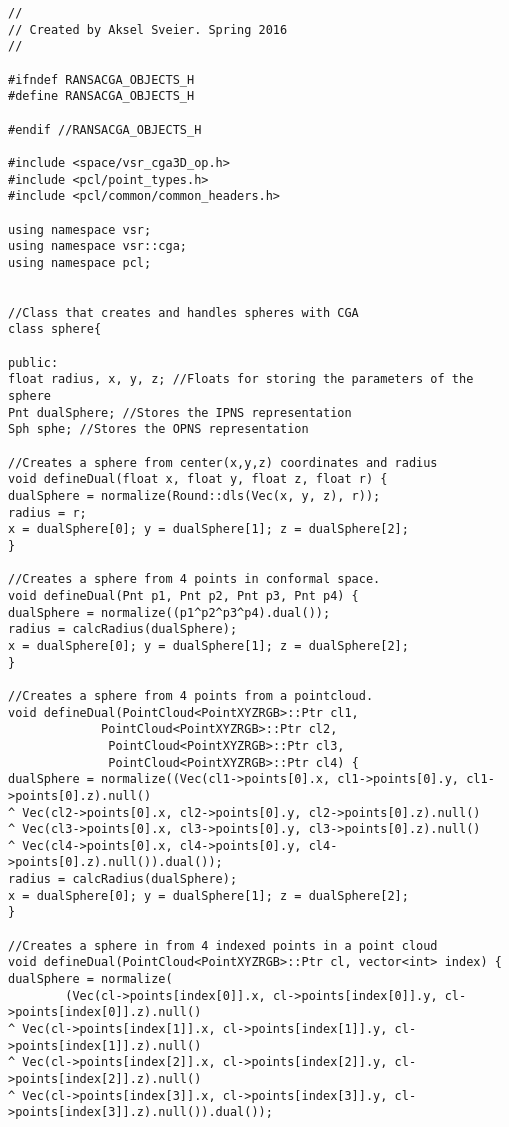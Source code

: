 {\fontsize{7.5}{10} \selectfont
\label{code:objects}
\begin{lstlisting}[caption={Archivo objects.h}]
//
// Created by Aksel Sveier. Spring 2016
//

#ifndef RANSACGA_OBJECTS_H
#define RANSACGA_OBJECTS_H

#endif //RANSACGA_OBJECTS_H

#include <space/vsr_cga3D_op.h>
#include <pcl/point_types.h>
#include <pcl/common/common_headers.h>

using namespace vsr;
using namespace vsr::cga;
using namespace pcl;


//Class that creates and handles spheres with CGA
class sphere{

public:
float radius, x, y, z; //Floats for storing the parameters of the sphere
Pnt dualSphere; //Stores the IPNS representation
Sph sphe; //Stores the OPNS representation

//Creates a sphere from center(x,y,z) coordinates and radius
void defineDual(float x, float y, float z, float r) {
dualSphere = normalize(Round::dls(Vec(x, y, z), r));
radius = r;
x = dualSphere[0]; y = dualSphere[1]; z = dualSphere[2];
}

//Creates a sphere from 4 points in conformal space.
void defineDual(Pnt p1, Pnt p2, Pnt p3, Pnt p4) {
dualSphere = normalize((p1^p2^p3^p4).dual());
radius = calcRadius(dualSphere);
x = dualSphere[0]; y = dualSphere[1]; z = dualSphere[2];
}

//Creates a sphere from 4 points from a pointcloud.
void defineDual(PointCloud<PointXYZRGB>::Ptr cl1,
			 PointCloud<PointXYZRGB>::Ptr cl2,
			  PointCloud<PointXYZRGB>::Ptr cl3,
			  PointCloud<PointXYZRGB>::Ptr cl4) {
dualSphere = normalize((Vec(cl1->points[0].x, cl1->points[0].y, cl1->points[0].z).null()
^ Vec(cl2->points[0].x, cl2->points[0].y, cl2->points[0].z).null()
^ Vec(cl3->points[0].x, cl3->points[0].y, cl3->points[0].z).null()
^ Vec(cl4->points[0].x, cl4->points[0].y, cl4->points[0].z).null()).dual());
radius = calcRadius(dualSphere);
x = dualSphere[0]; y = dualSphere[1]; z = dualSphere[2];
}

//Creates a sphere in from 4 indexed points in a point cloud
void defineDual(PointCloud<PointXYZRGB>::Ptr cl, vector<int> index) {
dualSphere = normalize(
		(Vec(cl->points[index[0]].x, cl->points[index[0]].y, cl->points[index[0]].z).null()
^ Vec(cl->points[index[1]].x, cl->points[index[1]].y, cl->points[index[1]].z).null()
^ Vec(cl->points[index[2]].x, cl->points[index[2]].y, cl->points[index[2]].z).null()
^ Vec(cl->points[index[3]].x, cl->points[index[3]].y, cl->points[index[3]].z).null()).dual());


\end{lstlisting}}
